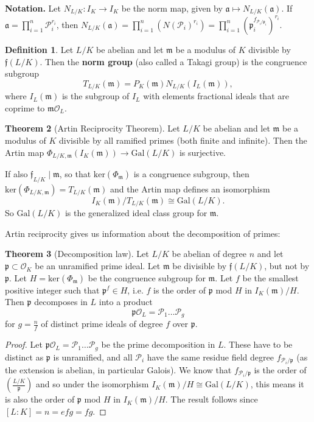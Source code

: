 \documentclass{article}
\theoremstyle{definition}
\newtheorem{theorem}{Theorem}[section]
\newtheorem{defn}[theorem]{Definition}
\begin{document}
\textbf{Notation.} Let $N_{L/K}: I_K \to I_K$ be the norm map, given by $\mathfrak{a} \mapsto N_{L/K}(\mathfrak{a})$. If $\mathfrak{a} =\prod_{i=1}^{n} \mathcal{P}_i^{r_i}$, then $N_{L/K}(\mathfrak{a}) = \prod_{i=1}^{n} (N(\mathcal{P}_i)^{r_i}) = \prod_{i=1}^{n} (\mathfrak{p}_i^{f_{\mathcal{P}_i/\mathfrak{p}_i}})^{r_i}$.
\begin{defn}
    Let $L/K$ be abelian and let $\mathfrak{m}$ be a modulus of $K$ divisible by $\mathfrak{f}(L/K)$. Then the \textbf{norm group} (also called a Takagi group) is the congruence subgroup
    \[
    T_{L/K}(\mathfrak{m}) = P_K(\mathfrak{m})N_{L/K}(I_L(\mathfrak{m})),
    \]
    where $I_L(\mathfrak{m})$ is the subgroup of $I_L$ with elements fractional ideals that are coprime to $\mathfrak{m}\mathcal{O}_L$.
\end{defn}
\begin{theorem}[Artin Reciprocity Theorem]
    Let $L/K$ be abelian and let $\mathfrak{m}$ be a modulus of $K$ divisible by all ramified primes (both finite and infinite). Then the Artin map $\Phi_{L/K,\mathfrak{m}}(I_K(\mathfrak{m})) \to \text{Gal}(L/K)$ is surjective.
    \vspace{1mm}
     
    If also $\mathfrak{f}_{L/K} \mid \mathfrak{m}$, so that $\text{ker}(\Phi_{\mathfrak{m}})$ is a congruence subgroup, then $\text{ker}(\Phi_{L/K,\mathfrak{m}}) = T_{L/K}(\mathfrak{m})$ and the Artin map defines an isomorphism \[
    I_K(\mathfrak{m})/T_{L/K}(\mathfrak{m}) \cong \text{Gal}(L/K).
    \]
    So $\text{Gal}(L/K)$ is the generalized ideal class group for $\mathfrak{m}$. 
\end{theorem}
Artin reciprocity gives us information about the decomposition of primes:
\begin{theorem}[Decomposition law]
    Let $L/K$ be abelian of degree $n$ and let $\mathfrak{p} \subset \mathcal{O}_K$ be an unramified prime ideal. Let $\mathfrak{m}$ be divisible by $\mathfrak{f}(L/K)$, but not by $\mathfrak{p}$. Let $H = \text{ker}(\Phi_{\mathfrak{m}})$ be the congruence subgroup for $\mathfrak{m}$. Let $f$ be the smallest positive integer such that $\mathfrak{p}^{f} \in H$, i.e. $f$ is the order of $\mathfrak{p}$ mod $H$ in $I_K(\mathfrak{m})/H$. Then $\mathfrak{p}$ decomposes in $L$ into a product $$\mathfrak{p}\mathcal{O}_L = \mathcal{P}_1 \ldots \mathcal{P}_g$$ for $g = \frac{n}{f}$ of distinct prime ideals of degree $f$ over $\mathfrak{p}$.
\end{theorem}
\begin{proof}
    Let $\mathfrak{p}\mathcal{O}_L = \mathcal{P}_1\ldots\mathcal{P}_g$ be the prime decomposition in $L$. These have to be distinct as $\mathfrak{p}$ is unramified, and all $\mathcal{P}_i$ have the same residue field degree $f_{\mathcal{P}_i/\mathfrak{p}}$ (as the extension is abelian, in particular Galois). We know that $f_{\mathcal{P}_i/\mathfrak{p}}$ is the order of $\left(\frac{L/K}{\mathfrak{p}}\right)$ and so under the isomorphism $I_K(\mathfrak{m})/H \cong \text{Gal}(L/K)$, this means it is also the order of $\mathfrak{p}$ mod $H$ in $I_K(\mathfrak{m})/H$. The result follows since $[L:K] = n = efg = fg$.
\end{proof}
\end{document}
